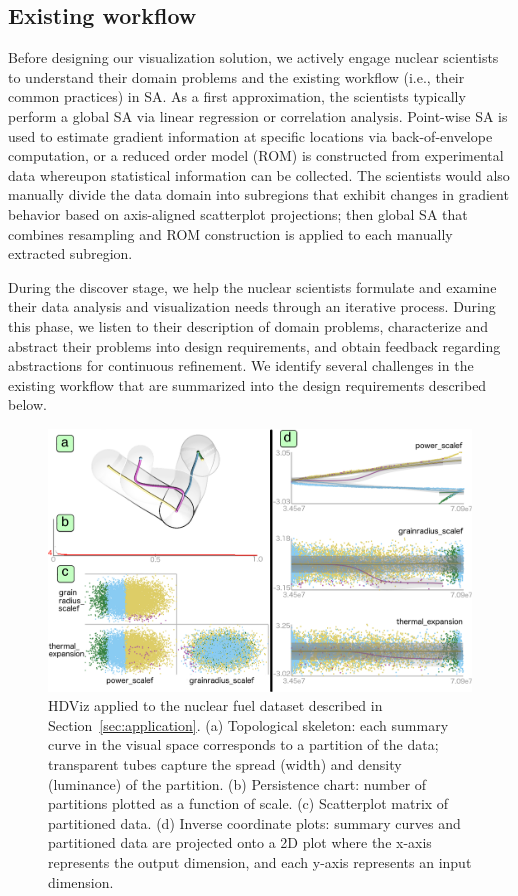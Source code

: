 \subsection{Existing workflow}
Before designing our visualization solution, we actively engage nuclear scientists to understand their domain problems and the existing workflow (i.e., their common practices) in SA.
%
As a first approximation, the scientists typically perform a global SA via linear regression or correlation analysis.
%
Point-wise SA is used to estimate gradient information at specific locations via back-of-envelope computation, or a reduced order model (ROM) is constructed from experimental data whereupon statistical information can be collected.
%
The scientists would also manually divide the data domain into subregions that exhibit changes in gradient behavior based on axis-aligned scatterplot projections; then global SA that combines resampling and ROM construction is applied to each manually extracted subregion.

During the discover stage, we help the nuclear scientists formulate and examine their data analysis and visualization needs through an iterative process.
%
During this phase, we listen to their description of domain problems, characterize and abstract their problems into design requirements, and obtain feedback regarding abstractions for continuous refinement.
%
We identify several challenges in the existing workflow that are summarized into the design requirements described below.

\begin{figure}[htbp]
  \centering
  \includegraphics[width=1.0\linewidth]{figs/chap6/HDViz-original}
  \caption{HDViz applied to the nuclear fuel
  dataset described in Section~\ref{sec:application}.
  (a) Topological skeleton: each summary curve in the visual space corresponds to a partition of the data; transparent tubes capture the spread (width) and density (luminance) of the partition.
  (b) Persistence chart: number of partitions plotted as a function of scale.
  (c) Scatterplot matrix of partitioned data.
  (d) Inverse coordinate plots: summary curves and partitioned data are projected onto a 2D plot where the x-axis represents the output dimension, and each y-axis
  represents an input dimension. }
  \label{fig:hdviz}
\end{figure}

